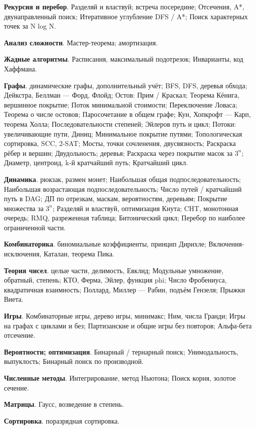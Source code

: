 \textbf{Рекурсия и перебор}. Разделяй и властвуй; встреча посередине; Отсечения, A*, двунаправленный поиск; Итеративное углубление DFS / A*; Поиск характерных точек за N log N.

\textbf{Анализ сложности}. Мастер-теорема; амортизация.

\textbf{Жадные алгоритмы}. Расписания, максимальный подотрезок; Инварианты, код Хаффмана.

\textbf{Графы}. динамические графы, дополнительный учёт; BFS, DFS, деревья обхода; Дейкстра, Беллман — Форд, Флойд; Остов: Прим / Краскал; Теорема Кёнига, вершинное покрытие; Поток минимальной стоимости; Переключение Ловаса; Теорема о числе остовов; Паросочетание в общем графе; Кун, Хопкрофт — Карп, теорема Холла; Последовательности степеней; Эйлеров путь и цикл; Потоки: увеличивающие пути, Диниц; Минимальное покрытие путями; Топологическая сортировка, SCC, 2-SAT; Мосты, точки сочленения, двусвязность; Раскраска рёбер и вершин; Двудольность; деревья; Раскраска через покрытие масок за $3^n$; Диаметр, центроид, k-й кратчайший путь; Кратчайший цикл.

\textbf{Динамика}. рюкзак, размен монет; Наибольшая общая подпоследовательность; Наибольшая возрастающая подпоследовательность; Число путей / кратчайший путь в DAG; ДП по отрезкам, маскам, вероятностям, деревьям; Покрытие множества за $3^n$; Разделяй и властвуй, оптимизация Кнута; CHT, монотонная очередь; RMQ, разреженная таблица; Битонический цикл; Перебор по наиболее ограниченной части.

\textbf{Комбинаторика}. биномиальные коэффициенты, принцип Дирихле; Включения-исключения, Каталан, теорема Пика.

\textbf{Теория чисел}. целые части, делимость, Евклид; Модульные умножение, обратный, степень; КТО, Ферма, Эйлер, функция phi; Число Фробениуса, квадратичная взаимность; Поллард, Миллер — Рабин, подъём Гензеля; Прыжки Виета.

\textbf{Игры}. Комбинаторные игры, дерево игры, минимакс; Ним, числа Гранди; Игры на графах с циклами и без; Партизанские и общие игры без повторов; Альфа-бета отсечение.

\textbf{Вероятности; оптимизация}. Бинарный / тернарный поиск; Унимодальность, выпуклость; Бинарный поиск по производной.

\textbf{Численные методы}. Интегрирование, метод Ньютона; Поиск корня, золотое сечение.

\textbf{Матрицы}. Гаусс, возведение в степень.

\textbf{Сортировка}. поразрядная сортировка.

